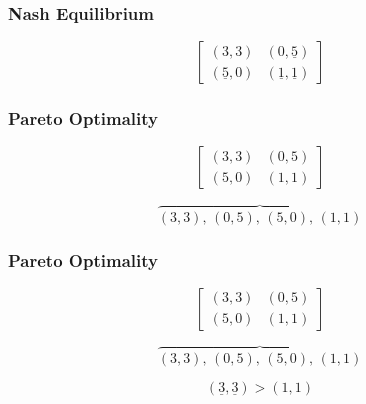 \begin{frame}
    \frametitle{Nash Equilibrium}
    
    \centering
    \begin{equation*}
        \begin{bmatrix}
            (3,3) & (0,\underline{5}) \\
            (\underline{5},0) & (\underline{1},\underline{1})
        \end{bmatrix}
    \end{equation*}

\end{frame}


\begin{frame}
    \frametitle{Pareto Optimality}
    
    \centering
    \begin{equation*}
        \begin{bmatrix}
            (3,3) & (0,5) \\
            (5,0) & (1,1)
        \end{bmatrix}
    \end{equation*}

    \vspace{-0.5cm}
    \begin{equation*}
        \overbrace{(3,3), \, (0,5), \, (5,0), \, (1,1)}
    \end{equation*}
\end{frame}


\begin{frame}
    \frametitle{Pareto Optimality}
    
    \centering
    \begin{equation*}
        \begin{bmatrix}
            (3,3) & (0,5) \\
            (5,0) & (1,1)
        \end{bmatrix}
    \end{equation*}

    \vspace{-0.5cm}
    \begin{equation*}
        \overbrace{(3,3), \, (0,5), \, (5,0), \, (1,1)}
    \end{equation*}

    \begin{equation*}
        (\underline{3},\underline{3}) > (1,1)
    \end{equation*}
\end{frame}